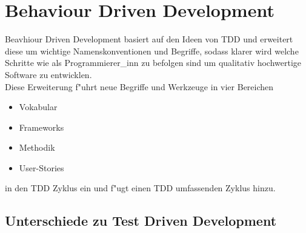 \section{Behaviour Driven Development}
  Beavhiour Driven Development basiert auf den Ideen von TDD und erweitert diese
  um wichtige Namenskonventionen und Begriffe, sodass klarer wird welche Schritte
  wie als Programmierer\_inn zu befolgen sind um qualitativ hochwertige Software
  zu entwicklen.\\
  Diese Erweiterung f"uhrt neue Begriffe und Werkzeuge in vier Bereichen
  \begin{itemize}
    \item Vokabular
    \item Frameworks
    \item Methodik
    \item User-Stories
  \end{itemize}
  in den TDD Zyklus ein und f"ugt einen TDD umfassenden Zyklus hinzu.

  \subsection{Unterschiede zu Test Driven Development}
